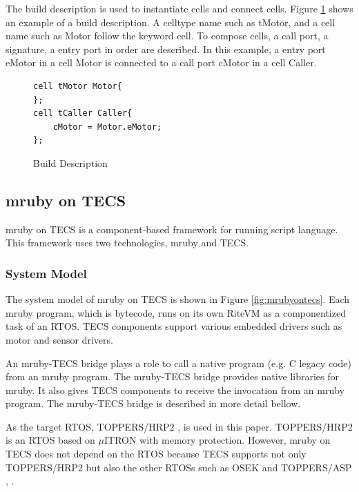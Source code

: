 \documentclass{sig-alternate-05-2015}
\begin{document}
\begin{description}
        The build description is used to instantiate {\myit cell}s and connect {\myit cell}s.
        Figure \ref{build} shows an example of a build description.
        A {\myit celltype} name such as tMotor, and a {\myit cell} name such as Motor follow the keyword {\myit cell}.
        To compose {\myit cell}s, a {\myit call} port, a {\myit signature}, a {\myit entry} port in order are described.
        In this example, a {\myit entry} port eMotor in a {\myit cell} Motor is connected to a {\myit call} port cMotor in a {\myit cell} Caller.
\begin{figure}[t]
\centering
\begin{lstlisting}
cell tMotor Motor{
};
cell tCaller Caller{
    cMotor = Motor.eMotor;
};
\end{lstlisting}
\caption{Build Description}
\label{build}
\end{figure}

\end{description}

\subsection{mruby on TECS}
\label{sec:mruby on TECS}
mruby on TECS is a component-based framework for running script language.
This framework uses two technologies, mruby and TECS.

\subsubsection{System Model}
The system model of mruby on TECS is shown in Figure \ref{fig:mrubyontecs}.
Each mruby program, which is bytecode, runs on its own RiteVM as a componentized task of an RTOS.
TECS components support various embedded drivers such as motor and sensor drivers.

An mruby-TECS bridge plays a role to call a native program (e.g. C legacy code) from an mruby program.
The mruby-TECS bridge provides native libraries for mruby.
It also gives TECS components to receive the invocation from an mruby program.
The mruby-TECS bridge is described in more detail bellow.

As the target RTOS, TOPPERS/HRP2 \cite{url:HRP2}, \cite{par:hr-tecs} is used in this paper.
TOPPERS/HRP2 is an RTOS based on $\mu$ITRON \cite{par:microITRON} with memory protection.
However, mruby on TECS does not depend on the RTOS because TECS supports not only TOPPERS/HRP2 but also the other RTOSs such as OSEK \cite{par:OSEK} and TOPPERS/ASP \cite{par:ASP}, \cite{url:ASP}.
\end{document}
